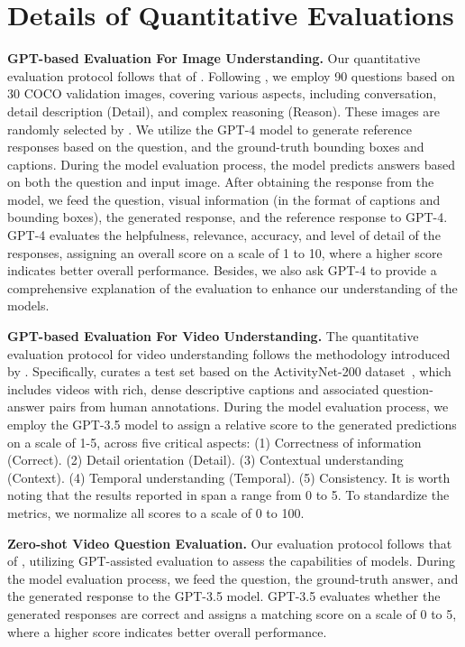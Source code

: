 \documentclass[10pt,twocolumn,letterpaper]{article}
\newcommand{\myparagraph}[1]{\textbf{#1}\hspace{1.8ex}}
\begin{document}
\section{Details of Quantitative Evaluations}\label{appendix:Details of Quantitative Evaluations}
\noindent \myparagraph{GPT-based Evaluation For Image Understanding.}
Our quantitative evaluation protocol follows that of \citet{liu2023visual}. Following \citet{liu2023visual,zhang2023llavar}, we employ 90 questions based on 30 COCO validation images, covering various aspects, including conversation, detail description (Detail), and complex reasoning (Reason). These images are randomly selected by \citet{liu2023visual}. We utilize the GPT-4 model to generate reference responses based on the question, and the ground-truth bounding boxes and captions. During the model evaluation process, the model predicts answers based on both the question and input image. After obtaining the response from the model, we feed the question, visual information (in the format of captions and bounding boxes), the generated response, and the reference response to GPT-4. GPT-4 evaluates the helpfulness, relevance, accuracy, and level of detail of the responses, assigning an overall score on a scale of 1 to 10, where a higher score indicates better overall performance. Besides, we also ask GPT-4 to provide a comprehensive explanation of the evaluation to enhance our understanding of the models.

\noindent \myparagraph{GPT-based Evaluation For Video Understanding.}
The quantitative evaluation protocol for video understanding follows the methodology introduced by \citet{maaz2023video}. Specifically, \citet{maaz2023video} curates a test set based on the ActivityNet-200 dataset~\cite{caba2015activitynet}, which includes videos with rich, dense descriptive captions and associated question-answer pairs from human annotations. During the model evaluation process, we employ the GPT-3.5 model to assign a relative score to the generated predictions on a scale of 1-5, across five critical aspects: (1) Correctness of information (Correct). (2) Detail orientation (Detail). (3) Contextual understanding (Context). (4) Temporal understanding (Temporal). (5) Consistency. It is worth noting that the results reported in \citet{maaz2023video} span a range from 0 to 5. To standardize the metrics, we normalize all scores to a scale of 0 to 100.

\noindent \myparagraph{Zero-shot Video Question Evaluation.}
Our evaluation protocol follows that of \citet{maaz2023video}, utilizing GPT-assisted evaluation to assess the capabilities of models. During the model evaluation process, we feed the question, the ground-truth answer, and the generated response to the GPT-3.5 model. GPT-3.5 evaluates whether the generated responses are correct and assigns a matching score on a scale of 0 to 5, where a higher score indicates better overall performance.
\end{document}
